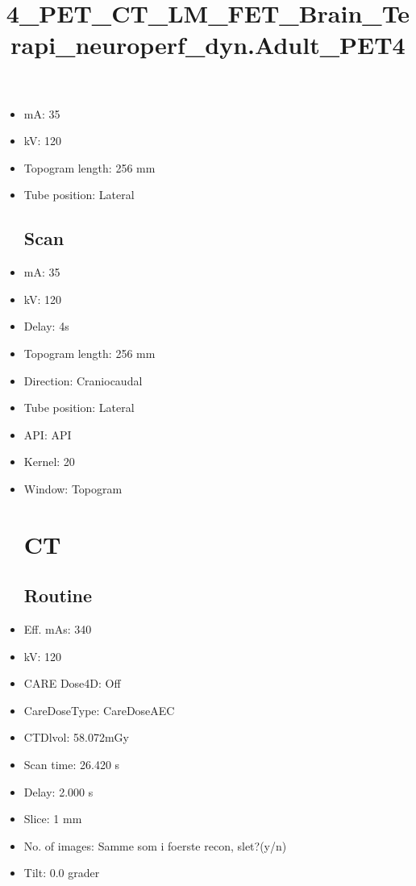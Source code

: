 \documentclass[12pt]{article}
\title{4\_PET\_CT\_LM\_FET\_Brain\_Terapi\_neuroperf\_dyn.Adult\_PET4}
\begin{document}
\maketitle
\newpage
\tableofcontents
\newpage
{}


\begin{itemize}\section{Topogram}
\subsection{Routine}
\item mA: 35\item kV: 120\item Topogram length: 256 mm\item Tube position: Lateral
\subsection{Scan}\item mA: 35\item kV: 120\item Delay: 4s\item Topogram length: 256 mm\item Direction: Craniocaudal\item Tube position: Lateral\item API: API \item Kernel: 20\item Window: Topogram
\section{CT}
\subsection{Routine}
\item Eff. mAs: 340\item kV: 120\item CARE Dose4D: Off\item CareDoseType: CareDoseAEC\item CTDlvol: 58.072mGy\item Scan time: 26.420 s\item Delay: 2.000 s\item Slice: 1 mm\item No. of images: Samme som i foerste recon, slet?(y/n)\item Tilt: 0.0 grader

\end{itemize}
\end{document}
